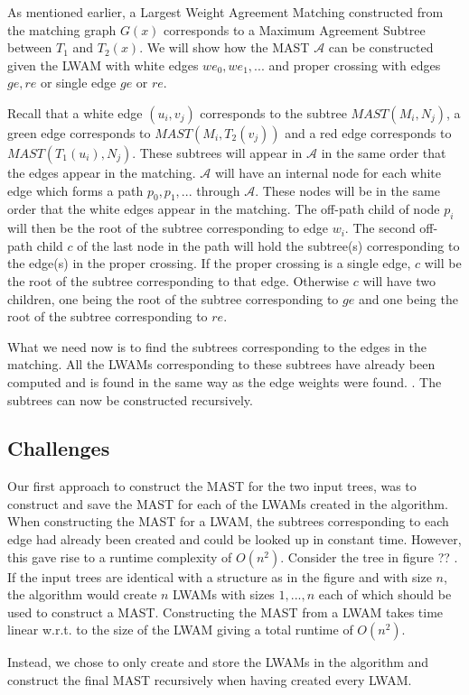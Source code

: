 As mentioned earlier, a Largest Weight Agreement Matching constructed from the matching graph $G(x)$ corresponds to a Maximum Agreement Subtree between $T_1$ and $T_2(x)$. We will show how the MAST $\mathcal{A}$ can be constructed given the LWAM with white edges ${we_0, we_1, ...}$ and proper crossing with edges ${ge, re}$ or single edge $ge$ or $re$.

Recall that a white edge $(u_i, v_j)$ corresponds to the subtree $MAST(M_i,N_j)$, a green edge corresponds to $MAST(M_i,T_2(v_j))$ and a red edge corresponds to $MAST(T_1(u_i),N_j)$. These subtrees will appear in $\mathcal{A}$ in the same order that the edges appear in the matching. $\mathcal{A}$ will have an internal node for each white edge which forms a path ${p_0, p_1, ...}$ through $\mathcal{A}$. These nodes will be in the same order that the white edges appear in the matching. The off-path child of node $p_i$ will then be the root of the subtree corresponding to edge $w_i$. The second off-path child $c$ of the last node in the path will hold the subtree(s) corresponding to the edge(s) in the proper crossing. If the proper crossing is a single edge, $c$ will be the root of the subtree corresponding to that edge. Otherwise $c$ will have two children, one being the root of the subtree corresponding to $ge$ and one being the root of the subtree corresponding to $re$.

What we need now is to find the subtrees corresponding to the edges in the matching. All the LWAMs corresponding to these subtrees have already been computed and is found in the same way as the edge weights were found. . The subtrees can now be constructed recursively.

\subsection{Challenges} 
Our first approach to construct the MAST for the two input trees, was to construct and save the MAST for each of the LWAMs created in the algorithm. When constructing the MAST for a LWAM, the subtrees corresponding to each edge had already been created and could be looked up in constant time. However, this gave rise to a runtime complexity of $O(n^2)$. Consider the tree in figure ?? . If the input trees are identical with a structure as in the figure and with size $n$, the algorithm would create $n$ LWAMs with sizes $1, ..., n$ each of which should be used to construct a MAST. Constructing the MAST from a LWAM takes time linear w.r.t. to the size of the LWAM giving a total runtime of $O(n^2)$.

Instead, we chose to only create and store the LWAMs in the algorithm and construct the final MAST recursively when having created every LWAM.








